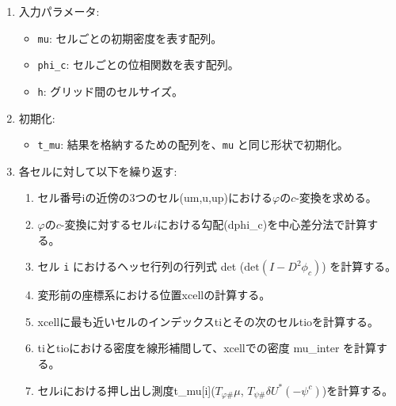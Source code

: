 \begin{enumerate}
    \item 入力パラメータ:
    \begin{itemize}
        \item \texttt{mu}: セルごとの初期密度を表す配列。
        \item \texttt{phi\_c}: セルごとの位相関数を表す配列。
        \item \texttt{h}: グリッド間のセルサイズ。
    \end{itemize}

    \item 初期化:
    \begin{itemize}
        \item \texttt{t\_mu}: 結果を格納するための配列を、\texttt{mu} と同じ形状で初期化。
    \end{itemize}

    \item 各セルに対して以下を繰り返す:
    \begin{enumerate}
        \item セル番号iの近傍の3つのセル(um,u,up)における$\varphi$の$c$-変換を求める。
        \item $\varphi$の$c$-変換に対するセル$i$における勾配(dphi\_c)を中心差分法で計算する。
        \item セル \texttt{i} におけるヘッセ行列の行列式 det ($\text{det}(I - D^2\phi_c)$) を計算する。
        \item 変形前の座標系における位置xcellの計算する。
        \item xcellに最も近いセルのインデックスtiとその次のセルtioを計算する。
        \item tiとtioにおける密度を線形補間して、xcellでの密度 mu\_inter を計算する。
        \item セルiにおける押し出し測度t\_mu[i]($T_{\varphi \#} \mu$, $T_{\psi \#} \delta U^*(- \psi^c)$)を計算する。
    \end{enumerate}

\end{enumerate}

